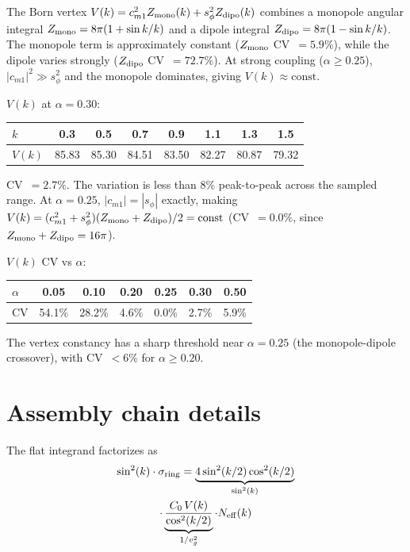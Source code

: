 \documentclass[11pt]{article}
\begin{document}
The Born vertex
$V(k) = c_{m1}^2 Z_{\rm mono}(k) + s_\phi^2 Z_{\rm dipo}(k)$ combines a
monopole angular integral $Z_{\rm mono} = 8\pi(1 + \sin k/k)$ and a dipole
integral $Z_{\rm dipo} = 8\pi(1 - \sin k/k)$. The monopole term is
approximately constant ($Z_{\rm mono}$ CV~$= 5.9\%$), while the dipole varies
strongly ($Z_{\rm dipo}$ CV~$= 72.7\%$). At strong coupling
($\alpha \geq 0.25$), $|c_{m1}|^2 \gg s_\phi^2$ and the monopole dominates,
giving $V(k) \approx \mathrm{const}$.

$V(k)$ at $\alpha = 0.30$:

\begin{table}[h]
\begin{tabular}{lccccccc}
\hline
$k$    & 0.3   & 0.5   & 0.7   & 0.9   & 1.1   & 1.3   & 1.5 \\
\hline
$V(k)$ & 85.83 & 85.30 & 84.51 & 83.50 & 82.27 & 80.87 & 79.32 \\
\hline
\end{tabular}
\end{table}

CV~$= 2.7\%$. The variation is less than 8\% peak-to-peak across the sampled
range. At $\alpha = 0.25$, $|c_{m1}| = |s_\phi|$ exactly, making
$V(k) = (c_{m1}^2 + s_\phi^2)(Z_{\rm mono} + Z_{\rm dipo})/2 =
\mathrm{const}$ (CV~$= 0.0\%$, since
$Z_{\rm mono} + Z_{\rm dipo} = 16\pi$).

$V(k)$ CV vs $\alpha$:

\begin{table}[h]
\begin{tabular}{lcccccc}
\hline
$\alpha$ & 0.05   & 0.10   & 0.20  & 0.25  & 0.30  & 0.50 \\
\hline
CV       & 54.1\% & 28.2\% & 4.6\% & 0.0\% & 2.7\% & 5.9\% \\
\hline
\end{tabular}
\end{table}

The vertex constancy has a sharp threshold near $\alpha = 0.25$ (the
monopole-dipole crossover), with CV~$< 6\%$ for $\alpha \geq 0.20$.

\section{Assembly chain details}
\label{sec:assembly}

The flat integrand factorizes as
%
\begin{multline}
\sin^2(k) \cdot \sigma_{\rm ring} =
  \underbrace{4\sin^2(k/2)\cos^2(k/2)}_{\sin^2(k)} \\
  \cdot \underbrace{\frac{C_0\,V(k)}{\cos^2(k/2)}}_{1/v_g^2}
  \cdot N_{\rm eff}(k)
\end{multline}
\end{document}
